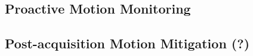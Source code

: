 \subsection{Proactive Motion Monitoring}

% 



\subsection{Post-acquisition Motion Mitigation (?)}



